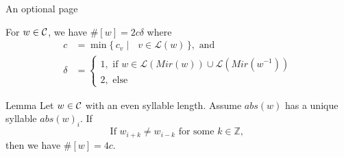 \documentclass[aspectratio={169}]{beamer}
\begin{document}
\begin{frame}{An optional page}

\begin{Lemma}
For $w \in \mathcal{C}$, we have $\#[w] = 2c\delta$ where
\begin{align*}
c &= \operatorname{min}\{\,c_v \mid \text{ $v \in \mathcal{L}(w)$}\,\}, \text{ and}  \\
\delta &= 
\begin{cases}
1, \text{ if $w \in \mathcal{L}(Mir(w)) \cup \mathcal{L}(Mir(w^{-1}))$}\\
2, \text{ else}
\end{cases}
\end{align*}
\end{Lemma}
 
\begin{block}{Lemma}
Let $w \in \mathcal{C}$ with an even syllable length. Assume $abs(w)$ has a unique syllable $abs(w)_i$. If
\begin{equation*}
\text{If } w_{i+k} \neq w_{i-k} \text{ for some $k\in\mathbb{Z}$, }
\end{equation*} then we have $\#[w]=4c$.
\end{block}
   
\end{frame}
\end{document}
